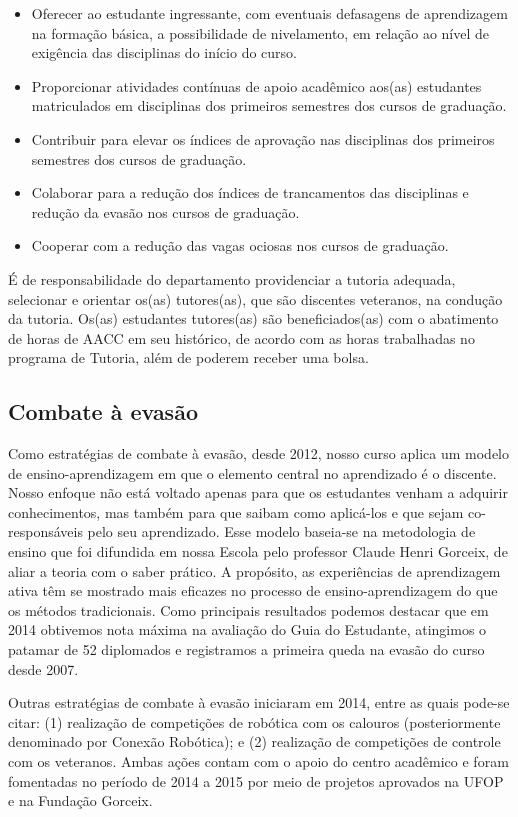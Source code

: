 \documentclass[
	12pt,				%
	openright,			%
	oneside,			%
	a4paper,			%
	english,			%
	brazil				%
	]{abntex2}
\begin{document}
\begin{itemize}
    \item Oferecer ao estudante ingressante, com eventuais defasagens de aprendizagem na formação básica, a possibilidade de nivelamento, em relação ao nível de exigência das disciplinas do início do curso.
    \item Proporcionar atividades contínuas de apoio acadêmico aos(as) estudantes matriculados em disciplinas dos primeiros semestres dos cursos de graduação.
    \item Contribuir para elevar os índices de aprovação nas disciplinas dos primeiros semestres dos cursos de graduação.
    \item Colaborar para a redução dos índices de trancamentos das disciplinas e redução da evasão nos cursos de graduação.
    \item Cooperar com a redução das vagas ociosas nos cursos de graduação.
\end{itemize}

É de responsabilidade do departamento providenciar a tutoria adequada, selecionar e orientar os(as) tutores(as), que são discentes veteranos, na condução da tutoria. Os(as) estudantes tutores(as) são beneficiados(as) com o abatimento de horas de AACC em seu histórico, de acordo com as horas trabalhadas no programa de Tutoria, além de poderem receber uma bolsa.

\subsection*{Combate à evasão}

Como estratégias de combate à evasão, desde 2012, nosso curso aplica um modelo de ensino-aprendizagem em que o elemento central no aprendizado é o discente. Nosso enfoque não está voltado apenas para que os estudantes venham a adquirir conhecimentos, mas também para que saibam como aplicá-los e que sejam co-responsáveis pelo seu aprendizado. Esse modelo baseia-se na metodologia de ensino que foi difundida em nossa Escola pelo professor Claude Henri Gorceix, de aliar a teoria com o saber prático. A propósito, as experiências de aprendizagem ativa têm se mostrado mais eficazes no processo de ensino-aprendizagem do que os métodos tradicionais. Como principais resultados podemos destacar que em 2014 obtivemos nota máxima na avaliação do Guia do Estudante, atingimos o patamar de 52 diplomados e registramos a primeira queda na evasão do curso desde 2007.

Outras estratégias de combate à evasão iniciaram em 2014, entre as quais pode-se citar: (1) realização de competições de robótica com os calouros (posteriormente denominado por Conexão Robótica); e (2) realização de competições de controle com os veteranos. Ambas ações contam com o apoio do centro acadêmico e foram fomentadas no período de 2014 a 2015 por meio de projetos aprovados na UFOP e na Fundação Gorceix.
\end{document}
